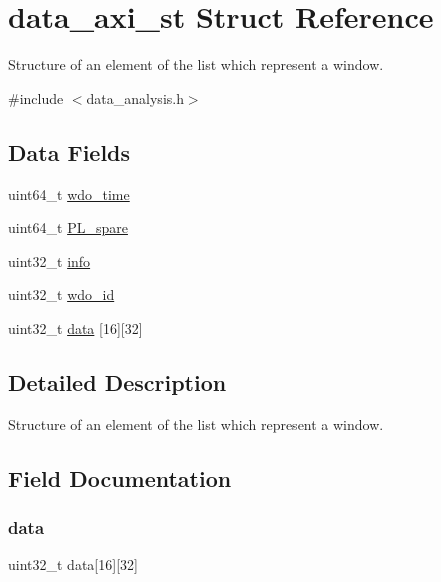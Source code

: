 \hypertarget{structdata__axi__st}{}\section{data\+\_\+axi\+\_\+st Struct Reference}
\label{structdata__axi__st}


Structure of an element of the list which represent a window.  




{\ttfamily \#include $<$data\+\_\+analysis.\+h$>$}

\subsection*{Data Fields}
\begin{DoxyCompactItemize}
\item 
uint64\+\_\+t \mbox{\hyperlink{structdata__axi__st_ad0e9cadeb03763deb31888ada41218ab}{wdo\+\_\+time}}
\item 
uint64\+\_\+t \mbox{\hyperlink{structdata__axi__st_a4f3f069aeefb33818c1360ddeaec0a41}{P\+L\+\_\+spare}}
\item 
uint32\+\_\+t \mbox{\hyperlink{structdata__axi__st_ab576d88e99031be3391d56e1d8c6b1e7}{info}}
\item 
uint32\+\_\+t \mbox{\hyperlink{structdata__axi__st_ae7e8b9ad7f59c14e9f28823e9f34495b}{wdo\+\_\+id}}
\item 
uint32\+\_\+t \mbox{\hyperlink{structdata__axi__st_a757fd0618a65f09037a72fb5a5f01088}{data}} \mbox{[}16\mbox{]}\mbox{[}32\mbox{]}
\end{DoxyCompactItemize}


\subsection{Detailed Description}
Structure of an element of the list which represent a window. 

\subsection{Field Documentation}
\mbox{\label{structdata__axi__st_a757fd0618a65f09037a72fb5a5f01088}} 
\subsubsection{\texorpdfstring{data}{data}}
{\footnotesize\ttfamily uint32\+\_\+t data\mbox{[}16\mbox{]}\mbox{[}32\mbox{]}}

